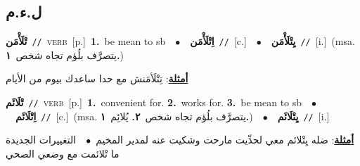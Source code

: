 \documentclass[10pt,a4paper,twoside]{article} %
\begin{document}
\begin{multicols}{2}
\vspace{-3mm}
\subsection*{\color{blue}\foreignlanguage{arabic}{ل.ء.م}\color{blue}{}} 

{\setlength\topsep{0pt}\textbf{\foreignlanguage{arabic}{تْلَأْمَن}}\ {\color{gray}\texttt{//}\color{black}}\ \textsc{verb}\ [p.]\ \textbf{1.}~be mean to sb\ \ $\bullet$\ \ \setlength\topsep{0pt}\textbf{\foreignlanguage{arabic}{اِتْلَأْمَن}}\ {\color{gray}\texttt{//}\color{black}}\ [c.]\ \ $\bullet$\ \ \setlength\topsep{0pt}\textbf{\foreignlanguage{arabic}{يِتْلَأْمَن}}\ {\color{gray}\texttt{//}\color{black}}\ [i.]\ \color{gray}(msa. \foreignlanguage{arabic}{يتصرَّف بلُؤم تجاه شخص}~\foreignlanguage{arabic}{\textbf{١.}})\color{black}\  \begin{flushright}\color{gray}\foreignlanguage{arabic}{\textbf{\underline{\foreignlanguage{arabic}{أمثلة}}}: تِتْلَأمَنش مع حدا ساعدك بيوم من الأيام}\end{flushright}\color{black}} \vspace{2mm}

{\setlength\topsep{0pt}\textbf{\foreignlanguage{arabic}{تْلَائَم}}\ {\color{gray}\texttt{//}\color{black}}\ \textsc{verb}\ [p.]\ \textbf{1.}~convenient for.  \textbf{2.}~works for.  \textbf{3.}~be mean to sb\ \ $\bullet$\ \ \setlength\topsep{0pt}\textbf{\foreignlanguage{arabic}{اِتْلَائَم}}\ {\color{gray}\texttt{//}\color{black}}\ [c.]\ \color{gray}(msa. \foreignlanguage{arabic}{يتصرَّف بلُؤم تجاه شخص}~\foreignlanguage{arabic}{\textbf{٢.}}  \foreignlanguage{arabic}{يُلائِم}~\foreignlanguage{arabic}{\textbf{١.}})\color{black}\ \ $\bullet$\ \ \setlength\topsep{0pt}\textbf{\foreignlanguage{arabic}{يِتْلَائَم}}\ {\color{gray}\texttt{//}\color{black}}\ [i.]\  \begin{flushright}\color{gray}\foreignlanguage{arabic}{\textbf{\underline{\foreignlanguage{arabic}{أمثلة}}}: ضله يِتْلائم معي لحدِّيت مارحت وشكيت عنه لمدير المخيم\ $\bullet$\ \  التغييرات الجديدة ما تْلائمت مع وضعي الصحي}\end{flushright}\color{black}} \vspace{2mm}


\end{multicols}
\end{document}
